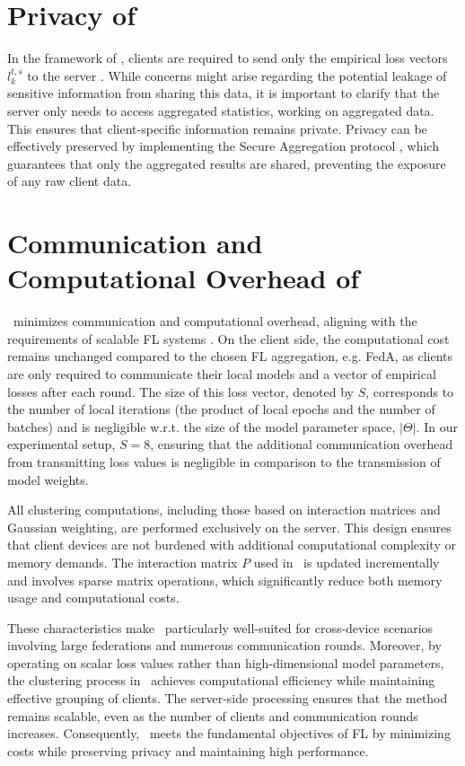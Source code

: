 \section{Privacy of \shortname}\label{app:privacy}
In the framework of \shortname, clients are required to send only the empirical loss vectors $l_k^{t,s}$ to the server \citep{cho2022towards}. While concerns might arise regarding the potential leakage of sensitive information from sharing this data, it is important to clarify that the server only needs to access aggregated statistics, working on aggregated data. This ensures that client-specific information remains private. Privacy can be effectively preserved by implementing the Secure Aggregation protocol \citep{bonawitz2016practical}, which guarantees that only the aggregated results are shared, preventing the exposure of any raw client data.

\section{Communication and Computational Overhead of \shortname}
\label{app:communication-computation}
\shortname\ minimizes communication and computational overhead, aligning with the requirements of scalable FL systems \citep{mcmahan2016federated}. On the client side, the computational cost remains unchanged compared to the chosen FL aggregation, e.g. FedA, as clients are only required to communicate their local models and a vector of empirical losses after each round. The size of this loss vector, denoted by \( S \), corresponds to the number of local iterations (\ie the product of local epochs and the number of batches) and is negligible w.r.t. the size of the model parameter space, \( |\Theta| \). In our experimental setup, \( S = 8 \), ensuring that the additional communication overhead from transmitting loss values is negligible in comparison to the transmission of model weights. 


All clustering computations, including those based on interaction matrices and Gaussian weighting, are performed exclusively on the server. This design ensures that client devices are not burdened with additional computational complexity or memory demands. The interaction matrix $P$ used in \shortname\ is updated incrementally and involves sparse matrix operations, which significantly reduce both memory usage and computational costs.

These characteristics make \shortname\ particularly well-suited for cross-device scenarios involving large federations and numerous communication rounds.
Moreover, by operating on scalar loss values rather than high-dimensional model parameters, the clustering process in \shortname\ achieves computational efficiency while maintaining effective grouping of clients. The server-side processing ensures that the method remains scalable, even as the number of clients and communication rounds increases. Consequently, \shortname\ meets the fundamental objectives of FL by minimizing costs while preserving privacy and maintaining high performance.

